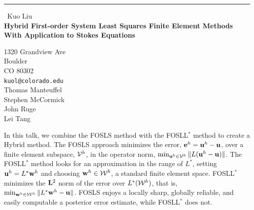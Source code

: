 \documentclass{report}
\begin{document}
\begin{center}
\rule{6in}{1pt} \
{\large Kuo Liu \\
{\bf Hybrid First-order System Least Squares Finite Element Methods With Application to Stokes Equations}}

1320 Grandview Ave \\ Boulder \\ CO 80302
\\
{\tt kuol@colorado.edu}\\
Thomas Manteuffel\\
Stephen McCormick\\
John Ruge\\
Lei Tang\end{center}

\newcommand{\BB}{{\bf B}}
\newcommand{\BF}{{\bf F}}
\newcommand{\BL}{{\bf L}}
\newcommand{\BU}{{\bf U}}
\newcommand{\BV}{{\bf V}}
\newcommand{\BW}{{\bf W}}
\newcommand{\BZ}{{\bf Z}}

\newcommand{\bb}{{\bf b}}
\newcommand{\bc}{{\bf c}}
\newcommand{\bfe}{{\bf e}}
\newcommand{\bff}{{\bf f}}
\newcommand{\bg}{{\bf g}}
\newcommand{\bn}{{\bf n}}
\newcommand{\bp}{{\bf p}}
\newcommand{\br}{{\bf r}}
\newcommand{\bu}{{\bf u}}
\newcommand{\bv}{{\bf v}}
\newcommand{\bw}{{\bf w}}
\newcommand{\bx}{{\bf x}}
\newcommand{\by}{{\bf y}}
\newcommand{\bz}{{\bf z}}


\newcommand{\btau}{\mathbf{\tau}}
\newcommand{\bzero}{{\bf 0}}
\newcommand{\Bzero}{{\bf O}}
\newcommand{\bomega}{\mathbf{\omega}}

\newcommand{\CB}{{\cal B}}
\newcommand{\CC}{{\cal C}}
\newcommand{\CD}{{\cal D}}
\newcommand{\CF}{{\cal F}}
\newcommand{\CG}{{\cal G}}
\newcommand{\CH}{{\cal H}}
\newcommand{\CI}{{\cal I}}
\newcommand{\CL}{{\cal L}}
\newcommand{\CN}{{\cal N}}
\newcommand{\CO}{{\cal O}}
\newcommand{\CR}{{\cal R}}
\newcommand{\CT}{{\cal T}}
\newcommand{\CU}{{\cal U}}
\newcommand{\CV}{{\cal V}}
\newcommand{\CW}{{\cal W}}




In this talk, we combine the FOSLS method with the FOSLL$^*$ method to
create a Hybrid method.
The FOSLS approach minimizes the error, $\bfe^h = \bu^h - \bu$, over a finite element
subspace, $\CV^h$,
in the operator norm, $\min_{\bu^h\in\CV^h}\| L (\bu^h-\bu) \|$. The FOSLL$^*$ method
looks for an approximation
in the range of $L^*$, setting $\bu^h = L^*\bw^h$ and choosing $\bw^h \in \CW^h$, a
standard finite element space.
FOSLL$^*$ minimizes the $\BL^2$ norm of the error over $L^*(\CW^h)$, that is,
$\min_{\bw^h\in\CW^h} \| L^*\bw^h - \bu\|$.
FOSLS enjoys a locally sharp, globally reliable, and easily computable a posterior error
estimate, while FOSLL$^*$
does not.
\end{document}
